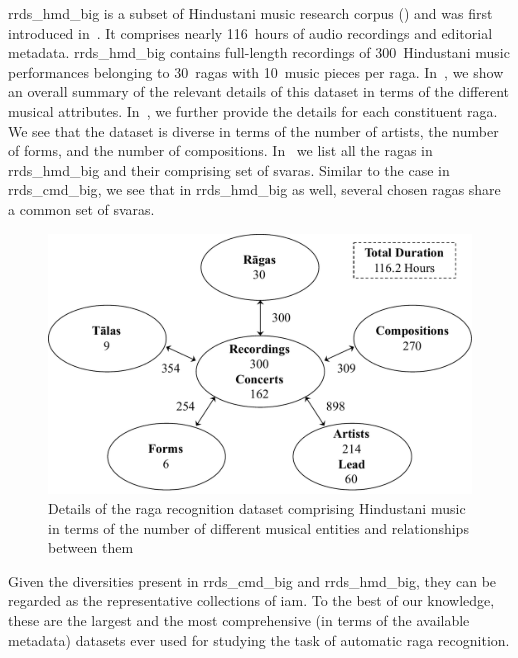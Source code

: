 {{{{\acrshort{rrds_hmd_big} is a subset of Hindustani music research corpus () and was first introduced in~\cite{gulati_tdms_2016}. It comprises nearly 116\, hours of audio recordings and editorial metadata. \acrshort{rrds_hmd_big} contains full-length recordings of 300~Hindustani music performances belonging to 30~\glspl{raga} with 10~music pieces per \gls{raga}. In~, we show an overall summary of the relevant details of this dataset in terms of the different musical attributes. In~, we  further provide the details for each constituent \gls{raga}. We see that the dataset is diverse in terms of the number of artists, the number of forms, and the number of compositions. In~ we list all the \glspl{raga} in \acrshort{rrds_hmd_big} and their comprising set of \glspl{svara}. Similar to the case in \acrshort{rrds_cmd_big}, we see that in \acrshort{rrds_hmd_big} as well, several chosen \glspl{raga} share a common set of \glspl{svara}. 




\begin{figure}
	\begin{center}
		\includegraphics[width=\figSizeNinety]{ch04_datasets/figures/hindustani_corpus_ragaDB.pdf}
	\end{center}
	\caption[Details of the \gls{raga} recognition dataset comprising Hindustani music]{Details of the \gls{raga} recognition dataset comprising Hindustani music in terms of the number of different musical entities and relationships between them}
	\label{fig:hindustani_ragaDB_details}
\end{figure}


Given the diversities present in \acrshort{rrds_cmd_big} and \acrshort{rrds_hmd_big}, they can be regarded as the representative collections of \gls{iam}. To the best of our knowledge, these are the largest and the most comprehensive (in terms of the available metadata) datasets ever used for studying the task of automatic \gls{raga} recognition.


}}}}
